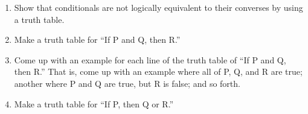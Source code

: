 \probsec{~\ref{sec:truth-tables}}
\begin{enumerate}
    \item Show that conditionals are not logically equivalent to their converses by using a truth table.
    \item Make a truth table for ``If P and Q, then R.''
    \item Come up with an example for each line of the truth table of ``If P and Q, then R.'' That is, come up with an example where all of P, Q, and R are true; another where P and Q are true, but R is false; and so forth.
    \item Make a truth table for ``If P, then Q or R.''
\end{enumerate}
